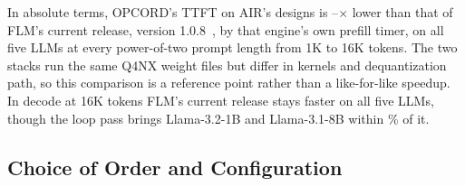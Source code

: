 In absolute terms, OPCORD's TTFT on AIR's designs is \AbsGainLo--\AbsGainHi$\times$ lower than that of FLM's current release, version 1.0.8~\citep{fastflowlm-repo}, by that engine's own prefill timer, on all five LLMs at every power-of-two prompt length from 1K to 16K tokens.
The two stacks run the same Q4NX weight files but differ in kernels and dequantization path, so this comparison is a reference point rather than a like-for-like speedup.
In decode at 16K tokens FLM's current release stays faster on all five LLMs, though the loop pass brings Llama-3.2-1B and Llama-3.1-8B within \AbsDecodeClosePct\% of it.

\subsection{Choice of Order and Configuration}
\label{subsec:decision}

